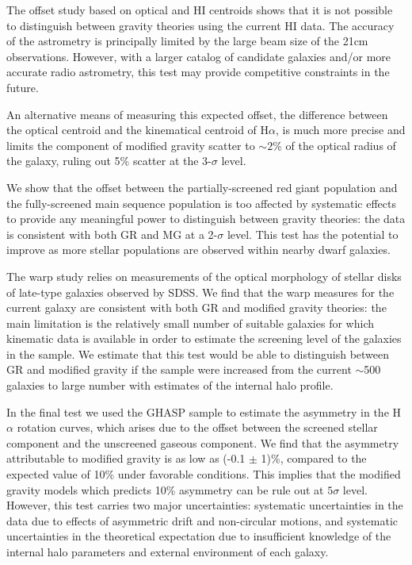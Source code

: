 \documentclass[useAMS,usenatbib,twocolumn]{mn2e}
\newcommand{\ha}{H$\alpha$}
\begin{document}
The offset study based on optical and HI centroids shows that it is not
possible to distinguish between gravity theories using the current HI data. 
The accuracy of the astrometry is principally limited by the large beam size of
the 21cm observations.  However, with a larger catalog of candidate
galaxies and/or more accurate radio astrometry, this test may provide
competitive constraints in the future.

An alternative means of measuring this expected offset, the difference
between the optical centroid and the kinematical centroid of \ha{}, is
much more precise and limits the component of modified gravity scatter
to  $\sim 2$\% of the optical radius of the galaxy, ruling out 5\%
scatter at the 3-$\sigma$ level.

We show that the offset between the partially-screened red giant
population and the fully-screened main sequence population is too
affected by systematic effects to provide any meaningful power to distinguish
between gravity theories: the data is consistent with both GR and MG at
a 2-$\sigma$ level.  This test has the potential to improve as more stellar
populations are observed within nearby dwarf galaxies.

The warp study relies on measurements of the optical morphology of stellar
disks of late-type galaxies observed by SDSS.
We find that the warp measures for the current galaxy are
consistent with both GR and modified gravity theories: the main limitation
is the relatively small number of suitable galaxies for which kinematic data
is available in order to estimate the screening level of the galaxies in
the sample.  We estimate that this test would be able to
distinguish between GR and modified gravity if the sample were increased
from the current $\sim$500 galaxies to large number
with estimates of the internal halo profile.

In the final test we used the GHASP sample to estimate
the asymmetry in the \ha{} rotation curves, which arises due to the
offset between the screened stellar component and the unscreened gaseous
component. We find that the asymmetry attributable to modified gravity is as
low as (-0.1 $\pm$ 1)\%, compared to the expected value of 10\% under
favorable conditions.
This implies that the modified gravity models which predicts 10\%
asymmetry can be rule out at $5 \sigma$ level. However, this test carries two
major uncertainties: systematic uncertainties in the data due to effects of
asymmetric drift and non-circular motions, and systematic uncertainties in
the theoretical expectation due to insufficient knowledge of the internal
halo parameters and external environment of each galaxy.
\end{document}
